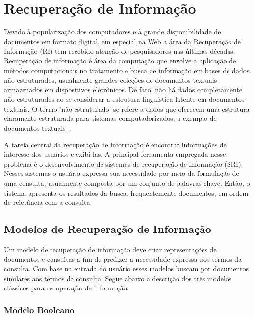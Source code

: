 \section{Recuperação de Informação}


Devido à popularização dos computadores e à grande disponibilidade de documentos em formato digital, em especial na Web a área da Recuperação de Informação (RI) tem recebido atenção de pesquisadores nas últimas décadas.
% 
Recuperação de informação é área da computação que envolve a aplicação de métodos computacionais no tratamento e busca de informação em bases de dados não estruturados, usualmente grandes coleções de documentos textuais armazenados em dispositivos eletrônicos. De fato, não há dados completamente não estruturados ao se considerar a estrutura linguística latente em documentos textuais. O termo 'não estruturado' se refere a dados que oferecem uma estrutura claramente estruturada para sistemas computadorizados, a exemplo de documentos 
textuais~\cite{Manning2008}.

A tarefa central da recuperação de informação é encontrar informações de interesse dos usuários e exibi-las. A principal ferramenta empregada nesse problema é o desenvolvimento de sistemas de recuperação de informação (SRI). Nesses sistemas o usuário expressa sua necessidade por meio da formulação de uma consulta, usualmente composta por um conjunto de palavras-chave. Então, o sistema apresenta os resultados da busca, frequentemente documentos, em ordem de relevância com a consulta.



\subsection{Modelos de Recuperação de Informação}

Um modelo de recuperação de informação deve criar representações de documentos e consultas a fim de predizer a necessidade expressa nos termos da consulta. Com base na entrada do usuário esses modelos buscam por documentos similares aos termos da consulta. Segue abaixo a descrição dos três modelos clássicos para recuperação de informação.

\subsubsection{Modelo Booleano}

